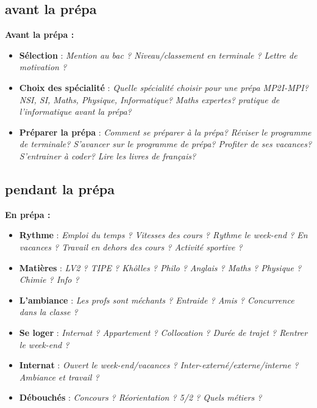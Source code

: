 \documentclass{beamer}
\begin{document}
\subsection{avant la prépa}

\begin{frame}
    \textbf{Avant la prépa :}
    \begin{itemize}
        \item \textbf{Sélection} : \textit{Mention au bac ? Niveau/classement en terminale ? Lettre de motivation ?}
        \item \textbf{Choix des spécialité} : \textit{Quelle spécialité choisir pour une prépa MP2I-MPI? NSI, SI, Maths, Physique, Informatique? Maths expertes? pratique de l'informatique avant la prépa?}
        \item \textbf{Préparer la prépa} : \textit{Comment se préparer à la prépa? Réviser le programme de terminale? S'avancer sur le programme de prépa? Profiter de ses vacances? S'entrainer à coder? Lire les livres de français?}
    \end{itemize}
\end{frame}

\subsection{pendant la prépa}

\begin{frame}
    \textbf{En prépa :}
    \begin{itemize}
        \item \textbf{Rythme} : \textit{Emploi du temps ? Vitesses des cours ? Rythme le week-end ? En vacances ? Travail en dehors des cours ? Activité sportive ?}
        \item \textbf{Matières} : \textit{LV2 ? TIPE ? Khôlles ? Philo ? Anglais ? Maths ? Physique ? Chimie ? Info ?}
        \item \textbf{L'ambiance} : \textit{Les profs sont méchants ? Entraide ? Amis ? Concurrence dans la classe ?}
        \item \textbf{Se loger} : \textit{Internat ? Appartement ?  Collocation ? Durée de trajet ? Rentrer le week-end ?}
        \item \textbf{Internat} : \textit{Ouvert le week-end/vacances ? Inter-externé/externe/interne ? Ambiance et travail ?}
        \item \textbf{Débouchés} : \textit{Concours ? Réorientation ? 5/2 ? Quels métiers ?}
    \end{itemize}
\end{frame}
\end{document}
